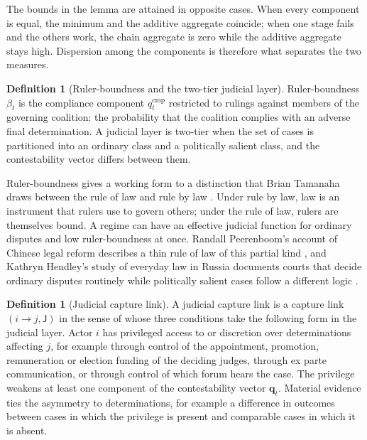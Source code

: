 \documentclass[11pt,letterpaper]{article}
\theoremstyle{definition}
\newtheorem{definition}[theorem]{Definition}
\theoremstyle{remark}
\newcommand{\pJ}{\mathsf{J}}
\begin{document}
The bounds in the lemma are attained in opposite cases. When every component is equal, the minimum and the additive aggregate coincide; when one stage fails and the others work, the chain aggregate is zero while the additive aggregate stays high. Dispersion among the components is therefore what separates the two measures.

\begin{definition}[Ruler-boundness and the two-tier judicial layer]
\label{def:judicial-power:boundness}
Ruler-boundness $\beta_t$ is the compliance component $q^{\mathrm{cmp}}_t$ restricted to rulings against members of the governing coalition: the probability that the coalition complies with an adverse final determination. A judicial layer is two-tier when the set of cases is partitioned into an ordinary class and a politically salient class, and the contestability vector differs between them.
\end{definition}

Ruler-boundness gives a working form to a distinction that Brian Tamanaha draws between the rule of law and rule by law \citep{tamanaha2004}. Under rule by law, law is an instrument that rulers use to govern others; under the rule of law, rulers are themselves bound. A regime can have an effective judicial function for ordinary disputes and low ruler-boundness at once. Randall Peerenboom's account of Chinese legal reform describes a thin rule of law of this partial kind \citep{peerenboom2002}, and Kathryn Hendley's study of everyday law in Russia documents courts that decide ordinary disputes routinely while politically salient cases follow a different logic \citep{hendley2017}.

\begin{definition}[Judicial capture link]
\label{def:judicial-power:capture}
A judicial capture link is a capture link $(i\to j,\pJ)$ in the sense of \citet{largo2026hbs} whose three conditions take the following form in the judicial layer. Actor $i$ has privileged access to or discretion over determinations affecting $j$, for example through control of the appointment, promotion, remuneration or election funding of the deciding judges, through ex parte communication, or through control of which forum hears the case. The privilege weakens at least one component of the contestability vector $\mathbf{q}_t$. Material evidence ties the asymmetry to determinations, for example a difference in outcomes between cases in which the privilege is present and comparable cases in which it is absent.
\end{definition}
\end{document}
